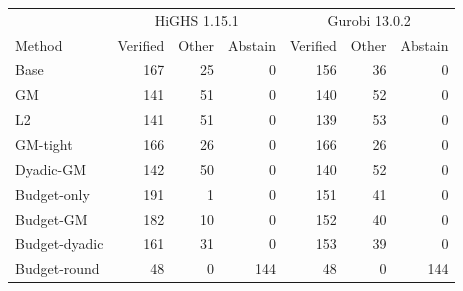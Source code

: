 \begin{tabular}{lrrrrrr}
\toprule
& \multicolumn{3}{c}{HiGHS 1.15.1} & \multicolumn{3}{c}{Gurobi 13.0.2} \\
Method & Verified & Other & Abstain & Verified & Other & Abstain \\
\midrule
Base & 167 & 25 & 0 & 156 & 36 & 0 \\
GM & 141 & 51 & 0 & 140 & 52 & 0 \\
L2 & 141 & 51 & 0 & 139 & 53 & 0 \\
GM-tight & 166 & 26 & 0 & 166 & 26 & 0 \\
Dyadic-GM & 142 & 50 & 0 & 140 & 52 & 0 \\
Budget-only & 191 & 1 & 0 & 151 & 41 & 0 \\
Budget-GM & 182 & 10 & 0 & 152 & 40 & 0 \\
Budget-dyadic & 161 & 31 & 0 & 153 & 39 & 0 \\
Budget-round & 48 & 0 & 144 & 48 & 0 & 144 \\
\bottomrule
\end{tabular}

